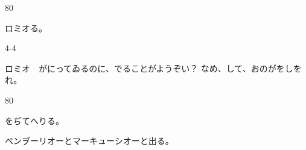 \documentclass[tate,paper=b6j,jafontsize=9pt]{jlreq}
\begin{document}

\begin{azconvIndented}{8\zw}{0\zw}

ロミオる。

\end{azconvIndented}
\begin{azconvIndented}{4\zw}{-4\zw}

ロミオ　がにってゐるのに、でることがようぞい？ なめ、して、おのがをしをれ。

\end{azconvIndented}
\begin{azconvIndented}{8\zw}{0\zw}

をぢてへりる。

ベンヺーリオーとマーキューシオーと出る。

\end{azconvIndented}
\end{document}
